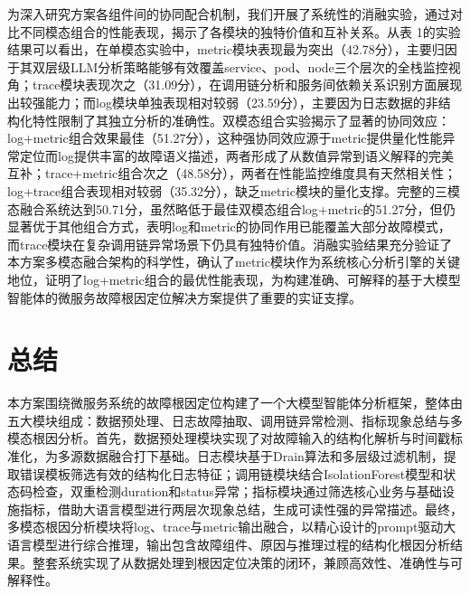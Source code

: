 \documentclass[11pt]{article}
\begin{document}
为深入研究方案各组件间的协同配合机制，我们开展了系统性的消融实验，通过对比不同模态组合的性能表现，揭示了各模块的独特价值和互补关系。从表 1的实验结果可以看出，在单模态实验中，metric模块表现最为突出（42.78分），主要归因于其双层级LLM分析策略能够有效覆盖service、pod、node三个层次的全栈监控视角；trace模块表现次之（31.09分），在调用链分析和服务间依赖关系识别方面展现出较强能力；而log模块单独表现相对较弱（23.59分），主要因为日志数据的非结构化特性限制了其独立分析的准确性。双模态组合实验揭示了显著的协同效应：log+metric组合效果最佳（51.27分），这种强协同效应源于metric提供量化性能异常定位而log提供丰富的故障语义描述，两者形成了从数值异常到语义解释的完美互补；trace+metric组合次之（48.58分），两者在性能监控维度具有天然相关性；log+trace组合表现相对较弱（35.32分），缺乏metric模块的量化支撑。完整的三模态融合系统达到50.71分，虽然略低于最佳双模态组合log+metric的51.27分，但仍显著优于其他组合方式，表明log和metric的协同作用已能覆盖大部分故障模式，而trace模块在复杂调用链异常场景下仍具有独特价值。消融实验结果充分验证了本方案多模态融合架构的科学性，确认了metric模块作为系统核心分析引擎的关键地位，证明了log+metric组合的最优性能表现，为构建准确、可解释的基于大模型智能体的微服务故障根因定位解决方案提供了重要的实证支撑。

\section{总结}

本方案围绕微服务系统的故障根因定位构建了一个大模型智能体分析框架，整体由五大模块组成：数据预处理、日志故障抽取、调用链异常检测、指标现象总结与多模态根因分析。首先，数据预处理模块实现了对故障输入的结构化解析与时间戳标准化，为多源数据融合打下基础。日志模块基于Drain算法和多层级过滤机制，提取错误模板筛选有效的结构化日志特征；调用链模块结合IsolationForest模型和状态码检查，双重检测duration和status异常；指标模块通过筛选核心业务与基础设施指标，借助大语言模型进行两层次现象总结，生成可读性强的异常描述。最终，多模态根因分析模块将log、trace与metric输出融合，以精心设计的prompt驱动大语言模型进行综合推理，输出包含故障组件、原因与推理过程的结构化根因分析结果。整套系统实现了从数据处理到根因定位决策的闭环，兼顾高效性、准确性与可解释性。

%

\end{document}
